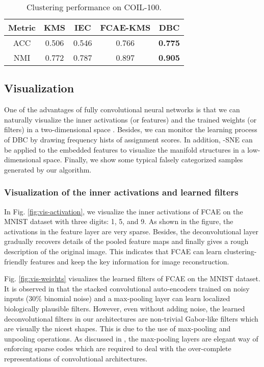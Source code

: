 \documentclass[preprint,12pt]{elsarticle}
\begin{document}
\begin{table}[!ht]
\centering
\begin{scriptsize}
\caption{Clustering performance on COIL-100.}
\label{tab:benchmarks-coil-100}
\begin{center}
\begin{tabular}{ccccc} \toprule
Metric & KMS & IEC  & FCAE-KMS & DBC \\
\midrule
ACC & 0.506 & 0.546 & 0.766 & \textbf{0.775} \\
NMI & 0.772 & 0.787 & 0.897 & \textbf{0.905} \\
\bottomrule
\end{tabular}
\end{center}
\end{scriptsize}
\end{table}



\subsection{Visualization}

One of the advantages of fully convolutional neural networks is that we can naturally visualize the inner activations (or features) and the trained weights (or filters) in a two-dimensional space \cite{Masci2011SCAE}. Besides, we can monitor
the learning process of DBC by drawing frequency hists of assignment scores. In addition, -SNE can be applied to
the embedded features to visualize the manifold structures in a low-dimensional space. Finally, we show some typical
falsely categorized samples generated by our algorithm.



\subsubsection{Visualization of the inner activations and learned filters}

In Fig. \ref{fig:vis-activation}, we visualize the inner activations of FCAE on the MNIST dataset with
three digits: 1, 5, and 9. As shown in the figure, the activations in the feature layer are very sparse.
Besides, the deconvolutional layer gradually recovers details of the pooled feature maps and finally gives a
rough description of the original image. This indicates that FCAE can learn clustering-friendly features and
keep the key information for image reconstruction.

Fig. \ref{fig:vis-weights} visualizes the learned filters of FCAE on the MNIST dataset. It is observed
in \cite{Masci2011SCAE} that the stacked convolutional auto-encoders trained on noisy inputs (30\% binomial noise)
and a max-pooling layer can learn localized biologically plausible filters. However, even without adding noise,
the learned deconvolutional filters in our architectures are non-trivial Gabor-like filters which are visually the
nicest shapes. This is due to the use of max-pooling and unpooling operations. As discussed in \cite{Masci2011SCAE},
the max-pooling layers are elegant way of enforcing sparse codes which are required to deal with the over-complete representations of convolutional architectures.
\end{document}
